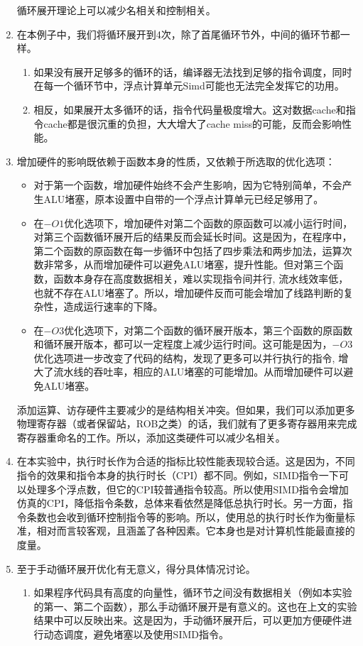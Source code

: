 \documentclass[english]{ctexart}
\begin{document}
\begin{enumerate}
循环展开理论上可以减少名相关和控制相关。
\item 在本例子中，我们将循环展开到4次，除了首尾循环节外，中间的循环节都一样。
\begin{enumerate}
\item 如果没有展开足够多的循环的话，编译器无法找到足够的指令调度，同时在每一个循环节中，浮点计算单元Simd可能也无法完全发挥它的功用。
\item 相反，如果展开太多循环的话，指令代码量极度增大。这对数据cache和指令cache都是很沉重的负担，大大增大了cache miss的可能，反而会影响性能。
\end{enumerate}
\item 增加硬件的影响既依赖于函数本身的性质，又依赖于所选取的优化选项：
\begin{itemize}
\item 对于第一个函数，增加硬件始终不会产生影响，因为它特别简单，不会产生ALU堵塞，原本设置中自带的一个浮点计算单元已经足够用了。
\item 在$-O1$优化选项下，增加硬件对第二个函数的原函数可以减小运行时间，对第三个函数循环展开后的结果反而会延长时间。这是因为，在程序中，第二个函数的原函数在每一步循环中包括了四步乘法和两步加法，运算次数非常多，从而增加硬件可以避免ALU堵塞，提升性能。但对第三个函数，函数本身存在高度数据相关，难以实现指令间并行,
流水线效率低，也就不存在ALU堵塞了。所以，增加硬件反而可能会增加了线路判断的复杂性，造成运行速率的下降。
\item 在$-O3$优化选项下，对第二个函数的循环展开版本，第三个函数的原函数和循环展开版本，都可以一定程度上减少运行时间。这可能是因为，$-O3$优化选项进一步改变了代码的结构，发现了更多可以并行执行的指令,
增大了流水线的吞吐率，相应的ALU堵塞的可能增加。从而增加硬件可以避免ALU堵塞。
\end{itemize}
添加运算、访存硬件主要减少的是结构相关冲突。但如果，我们可以添加更多物理寄存器（或者保留站，ROB之类）的话，我们就有了更多寄存器用来完成寄存器重命名的工作。所以，添加这类硬件可以减少名相关。
\item 在本实验中，执行时长作为合适的指标比较性能表现较合适。这是因为，不同指令的效果和指令本身的执行时长（CPI）都不同。例如，SIMD指令一下可以处理多个浮点数，但它的CPI较普通指令较高。所以使用SIMD指令会增加仿真的CPI，降低指令条数，总体来看依然是降低总执行时长。另一方面，指令条数也会收到循环控制指令等的影响。所以，使用总的执行时长作为衡量标准，相对而言较客观，且涵盖了各种因素。它本身也是对计算机性能最直接的度量。
\item 至于手动循环展开优化有无意义，得分具体情况讨论。
\begin{enumerate}
\item 如果程序代码具有高度的向量性，循环节之间没有数据相关（例如本实验的第一、第二个函数），那么手动循环展开是有意义的。这也在上文的实验结果中可以反映出来。这是因为，手动循环展开后，可以更加方便硬件进行动态调度，避免堵塞以及使用SIMD指令。

\end{enumerate}
\end{enumerate}
\end{document}
